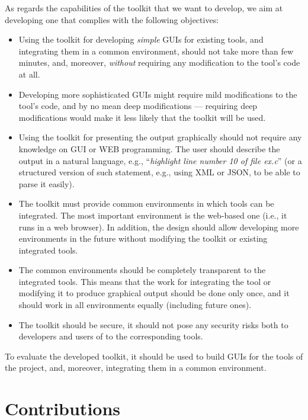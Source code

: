 As regards the capabilities of the toolkit that we want to develop, we
aim at developing one that complies with the following objectives:
%
\begin{itemize}
%
\item[\objdef{simplegui}] Using the toolkit for developing
  \emph{simple} GUIs for existing tools, and integrating them in a
  common environment, should not take more than few minutes, and,
  moreover, \emph{without} requiring any modification to the tool's
  code at all.
%
\item[\objdef{complexgui}] Developing more sophisticated GUIs might
  require mild modifications to the tool's code, and by no mean deep
  modifications --- requiring deep modifications would make it less
  likely that the toolkit will be used.
%
\item[\objdef{outputlang}] Using the toolkit for presenting the output
  graphically should not require any knowledge on GUI or WEB
  programming. The user should describe the output in a natural
  language, e.g., ``\emph{highlight line number 10 of file ex.c}'' (or
  a structured version of such statement, e.g., using XML or JSON, to
  be able to parse it easily).
%
\item[\objdef{commonenv}] The toolkit must provide common environments
  in which tools can be integrated. The most important environment is
  the web-based one (i.e., it runs in a web browser). In addition, the
  design should allow developing more environments in the future
  without modifying the toolkit or existing integrated tools.
%
\item[\objdef{commonenvtrans}] The common environments should be
  completely transparent to the integrated tools. This means that the
  work for integrating the tool or modifying it to produce graphical
  output should be done only once, and it should work in all
  environments equally (including future ones).
%
\item[\objdef{security}] The toolkit should be secure, it should not
  pose any security risks both to developers and users of to the
  corresponding tools.
\end{itemize}
%
To evaluate the developed toolkit, it should be used to build GUIs for
the tools of the \envisage project, and, moreover, integrating them in
a common environment.

\section{Contributions}

